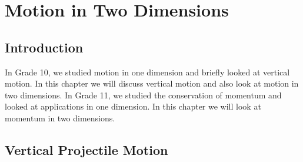 \chapter{Motion in Two Dimensions}
\label{p:m:m2d12}

\section{Introduction}
In Grade 10, we studied motion in one dimension and briefly looked at vertical motion. In this chapter we will discuss vertical motion and also look at motion in two dimensions. In Grade 11, we studied the conservation of momentum and looked at applications in one dimension. In this chapter we will look at momentum in two dimensions.

\section{Vertical Projectile Motion}
